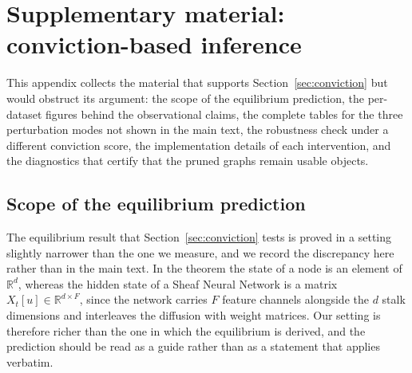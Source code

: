 %
%

\section{Supplementary material: conviction-based inference}
\label{sec:conviction_supp}

This appendix collects the material that supports
Section~\ref{sec:conviction} but would obstruct its argument: the scope of the
equilibrium prediction, the per-dataset figures behind the observational claims,
the complete tables for the three perturbation modes not shown in the main text,
the robustness check under a different conviction score, the implementation
details of each intervention, and the diagnostics that certify that the pruned
graphs remain usable objects.

\subsection{Scope of the equilibrium prediction}
\label{sec:supp_conv_scope}

The equilibrium result that Section~\ref{sec:conviction} tests is proved in a
setting slightly narrower than the one we measure, and we record the discrepancy
here rather than in the main text. In the theorem the state of a node is an
element of $\mathbb{R}^d$, whereas the hidden state of a Sheaf Neural Network is
a matrix $X_t[u] \in \mathbb{R}^{d \times F}$, since the network carries $F$
feature channels alongside the $d$ stalk dimensions and interleaves the
diffusion with weight matrices. Our setting is therefore richer than the one in
which the equilibrium is derived, and the prediction should be read as a guide
rather than as a statement that applies verbatim.


